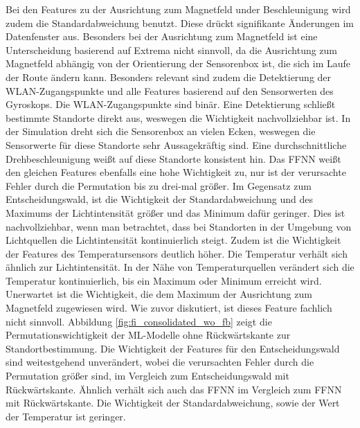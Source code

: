 \newline
\newline
Bei den Features zu der Ausrichtung zum Magnetfeld under Beschleunigung wird zudem die Standardabweichung benutzt.
Diese drückt signifikante Änderungen im Datenfenster aus.
Besonders bei der Ausrichtung zum Magnetfeld ist eine Unterscheidung basierend auf Extrema nicht sinnvoll,
da die Ausrichtung zum Magnetfeld abhängig von der Orientierung der Sensorenbox ist, die sich im Laufe der Route ändern kann.
\newline
\newline
Besonders relevant sind zudem die Detektierung der WLAN-Zugangspunkte und alle Features basierend auf den Sensorwerten des Gyroskops.
Die WLAN-Zugangspunkte sind binär.
Eine Detektierung schließt bestimmte Standorte direkt aus, weswegen die Wichtigkeit nachvollziehbar ist.
In der Simulation dreht sich die Sensorenbox an vielen Ecken, weswegen die Sensorwerte für diese Standorte sehr Aussagekräftig sind.
Eine durchschnittliche Drehbeschleunigung weißt auf diese Standorte konsistent hin.
\newline
\newline
Das FFNN weißt den gleichen Features ebenfalls eine hohe Wichtigkeit zu, nur ist der verursachte Fehler durch die Permutation bis zu drei-mal größer.
Im Gegensatz zum Entscheidungswald, ist die Wichtigkeit der Standardabweichung und des Maximums der Lichtintensität größer und das Minimum dafür geringer.
Dies ist nachvollziehbar, wenn man betrachtet, dass bei Standorten in der Umgebung von Lichtquellen die Lichtintensität kontinuierlich steigt.
Zudem ist die Wichtigkeit der Features des Temperatursensors deutlich höher.
Die Temperatur verhält sich ähnlich zur Lichtintensität.
In der Nähe von Temperaturquellen verändert sich die Temperatur kontinuierlich, bis ein Maximum oder Minimum erreicht wird.
Unerwartet ist die Wichtigkeit, die dem Maximum der Ausrichtung zum Magnetfeld zugewiesen wird.
Wie zuvor diskutiert, ist dieses Feature fachlich nicht sinnvoll.
\newline
\newline
Abbildung \ref{fig:fi_consolidated_wo_fb} zeigt die Permutationswichtigkeit der ML-Modelle ohne Rückwärtskante zur Standortbestimmung.
Die Wichtigkeit der Features für den Entscheidungswald sind weitestgehend unverändert,
wobei die verursachten Fehler durch die Permutation größer sind, im Vergleich zum Entscheidungswald mit Rückwärtskante.
Ähnlich verhält sich auch das FFNN im Vergleich zum FFNN mit Rückwärtskante.
Die Wichtigkeit der Standardabweichung, sowie der Wert der Temperatur ist geringer.
